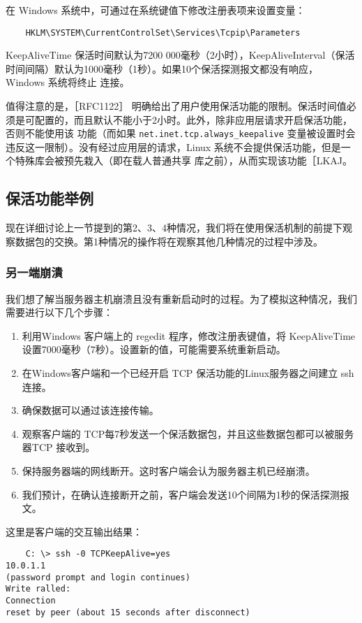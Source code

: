 在 Windows 系统中，可通过在系统键值下修改注册表项来设置变量：
\begin{verbatim}
    HKLM\SYSTEM\CurrentControlSet\Services\Tcpip\Parameters
\end{verbatim}

KeepAliveTime 保活时间默认为7200 000毫秒（2小时），KeepAliveInterval（保活时间间隔）默认为1000毫秒（1秒）。如果10个保活探测报文都没有响应，Windows 系统将终止
连接。

值得注意的是，［RFC1122］ 明确给出了用户使用保活功能的限制。保活时间值必须是可配置的，而且默认不能小于2小时。此外，除非应用层请求开启保活功能，否则不能使用该
功能（而如果 \verb|net.inet.tcp.always_keepalive| 变量被设置时会违反这一限制）。没有经过应用层的请求，Linux 系统不会提供保活功能，但是一个特殊库会被预先栽入（即在载人普通共享
库之前），从而实现该功能［LKAJ。

\subsection{保活功能举例}
现在详细讨论上一节提到的第2、3、4种情况，我们将在使用保活机制的前提下观察数据包的交换。第1种情况的操作将在观察其他几种情况的过程中涉及。
\subsubsection{另一端崩潰}
我们想了解当服务器主机崩溃且没有重新启动时的过程。为了模拟这种情况，我们需要进行以下几个步骤：
\begin{enumerate}
    \item 利用Windows 客户端上的 regedit 程序，修改注册表键值，将 KeepAliveTime 设置7000毫秒（7秒）。设置新的值，可能需要系统重新启动。
    \item 在Windows客户端和一个已经开启 TCP 保活功能的Linux服务器之间建立 ssh 连接。
    \item 确保数据可以通过该连接传输。
    \item 观察客户端的 TCP每7秒发送一个保活数据包，并且这些数据包都可以被服务器TCP 接收到。
    \item 保持服务器端的网线断开。这时客户端会认为服务器主机已经崩溃。
    \item 我们预计，在确认连接断开之前，客户端会发送10个间隔为1秒的保活探测报文。
\end{enumerate}

这里是客户端的交互输出结果：
\begin{verbatim}
    C: \> ssh -0 TCPKeepAlive=yes
10.0.1.1
(password prompt and login continues)
Write ralled:
Connection
reset by peer (about 15 seconds after disconnect)
\end{verbatim}


